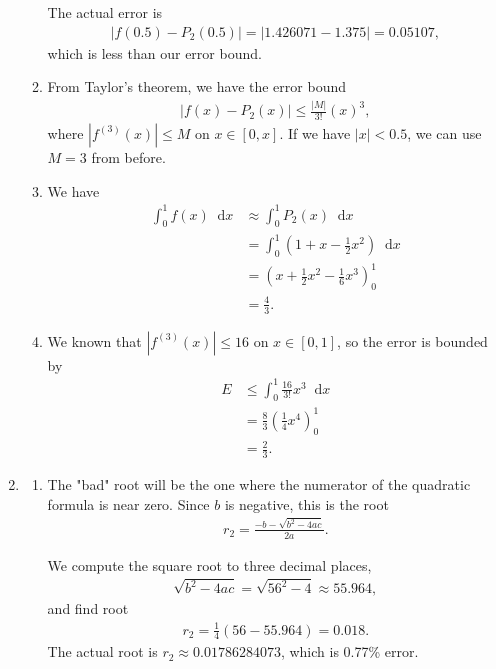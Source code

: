 \documentclass[10pt]{article}
\newcommand*{\dif}{\mathop{}\!\mathrm{d}}
\begin{document}
\begin{enumerate}
\begin{enumerate}
        The actual error is \begin{align*}
            |f(0.5) - P_2(0.5)| = |1.426071 - 1.375| = 0.05107,
        \end{align*} which is less than our error bound.

        \item From Taylor's theorem, we have the error bound \begin{align*}
            |f(x) - P_2(x)| \leq \frac{|M|}{3!}(x)^3,
        \end{align*} where \(|f^{(3)}(x)| \leq M\) on \(x \in [0, x]\). If we have \(|x| < 0.5\), we can use \(M=3\) from before.

        \item We have \begin{align*}
            \int_0^1 f(x)\dif x &\approx \int_0^1P_2(x)\dif x \\
            &= \int_0^1 \left( 1+x-\frac{1}{2}x^2 \right)\dif x \\
            &= \left( x+\frac{1}{2}x^2-\frac{1}{6}x^3 \right)_0^1 \\
            &= \frac{4}{3}.
        \end{align*}

        \item We known that \(|f^{(3)}(x)| \leq 16\) on \(x \in [0, 1]\), so the error is bounded by \begin{align*}
            E &\leq \int_0^1 \frac{16}{3!}x^3 \dif x \\
             &= \frac{8}{3} \left( \frac{1}{4}x^4 \right)_0^1 \\
             &= \frac{2}{3}.
        \end{align*}
    \end{enumerate}
    
    \item 
    \begin{enumerate}
    \item The "bad" root will be the one where the numerator of the quadratic formula is near zero. Since \(b\) is negative, this is the root \begin{align*}
        r_2 = \frac{-b - \sqrt{b^2-4ac}}{2a}.
    \end{align*}

    We compute the square root to three decimal places, \begin{align*}
        \sqrt{b^2-4ac} = \sqrt{56^2-4} \approx 55.964,
    \end{align*} and find root \begin{align*}
        r_2 = \frac{1}{4}\left( 56 - 55.964 \right) = 0.018.
    \end{align*} The actual root is \(r_2 \approx 0.01786284073\), which is 0.77\% error.


\end{enumerate}
\end{enumerate}
\end{document}
